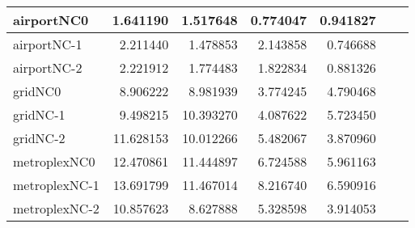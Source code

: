 \begin{longtable}{|l|r|r|r|r|r|r|}
airportNC0 & 1.641190 & 1.517648 & 0.774047 & 0.941827 \\ \hline
airportNC-1 & 2.211440 & 1.478853 & 2.143858 & 0.746688 \\ \hline
airportNC-2 & 2.221912 & 1.774483 & 1.822834 & 0.881326 \\ \hline
gridNC0 & 8.906222 & 8.981939 & 3.774245 & 4.790468 \\ \hline
gridNC-1 & 9.498215 & 10.393270 & 4.087622 & 5.723450 \\ \hline
gridNC-2 & 11.628153 & 10.012266 & 5.482067 & 3.870960 \\ \hline
metroplexNC0 & 12.470861 & 11.444897 & 6.724588 & 5.961163 \\ \hline
metroplexNC-1 & 13.691799 & 11.467014 & 8.216740 & 6.590916 \\ \hline
metroplexNC-2 & 10.857623 & 8.627888 & 5.328598 & 3.914053 \\ \hline
\end{longtable}
